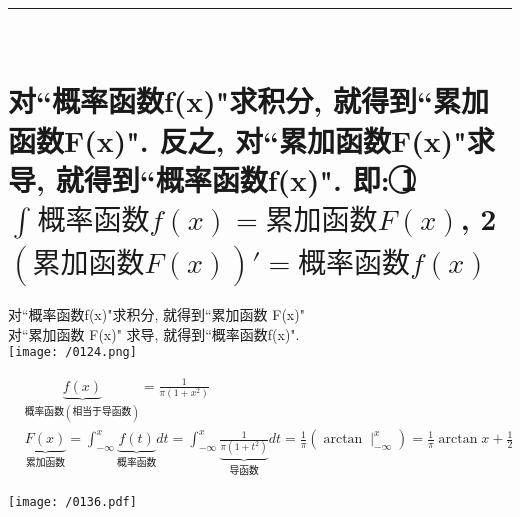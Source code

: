 \documentclass[UTF8]{ctexart}
\begin{document}
	
	~\\
	\hrule
	~\\
	
	
	
	\section{ 对``概率函数f(x)"求积分, 就得到``累加函数F(x)". 反之, 对``累加函数F(x)"求导, 就得到``概率函数f(x)". 即: \textcircled{1}  $\int_{}^{}{\text{概率函数}f\left( x \right)}=\text{累加函数}F\left( x \right) $, \textcircled{2}
		$\left( \text{累加函数}F\left( x \right) \right) '=\text{概率函数}f\left( x \right) $}
	
	对``概率函数f(x)"求积分, 就得到``累加函数 F(x)" \\
	对``累加函数 F(x)" 求导, 就得到``概率函数f(x)". \\
	
	\texttt{[image: /0124.png]} \\
	
	
	
	\begin{myEnvSample}
		\begin{align*}  %
			&\underset{\text{概率函数}\left( \text{相当于导函数} \right)}{\underbrace{f\left( x \right) }}=\frac{1}{\pi \left( 1+x^2 \right)}\\
			&\underset{\text{累加函数}}{\underbrace{F\left( x \right) }}
			=\int_{-\infty}^x{\underset{\text{概率函数}}{\underbrace{f\left( t \right) }}}dt
			=\int_{-\infty}^x{\underset{\text{导函数}}{\underbrace{\frac{1}{\pi \left( 1+t^2 \right)}}}}dt
			=\frac{1}{\pi}\left( \arctan \mid_{-\infty}^{x} \right) 
			=\frac{1}{\pi}\arctan x+\frac{1}{2}
		\end{align*}
		
		\texttt{[image: /0136.pdf]}
	\end{myEnvSample}
	\vspace{1em} 
	
	
	
\end{document}
